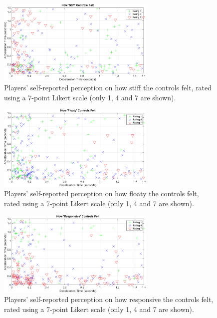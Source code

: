 \begin{figure}[htbp]
\centering
\includegraphics[width=0.67\textwidth]{Pics/Classes/Stiff_classes}
\caption{Players' self-reported perception on how stiff the controls felt, rated using a 7-point Likert scale (only 1, 4 and 7 are shown).}
\label{fig:stiff}
\end{figure}

\begin{figure}[htbp]
\centering
\includegraphics[width=0.67\textwidth]{Pics/Classes/Floaty_classes}
\caption{Players' self-reported perception on how floaty the controls felt, rated using a 7-point Likert scale (only 1, 4 and 7 are shown).}
\label{fig:floaty}
\end{figure}

\begin{figure}[htbp]
\centering
\includegraphics[width=0.67\textwidth]{Pics/Classes/Responsive_classes}
\caption{Players' self-reported perception on how responsive the controls felt, rated using a 7-point Likert scale (only 1, 4 and 7 are shown).}
\label{fig:responsive}
\end{figure}

